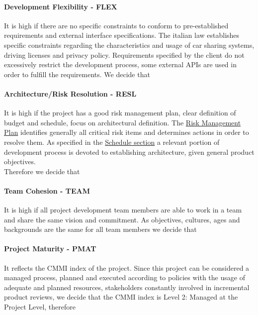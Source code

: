 \paragraph{Development Flexibility - FLEX} It is high if there are no specific constraints to conform to pre-established requirements and external interface specifications. The italian law establishes specific constraints regarding the characteristics and usage of car sharing systems, driving licenses and privacy policy. Requirements specified by the client do not excessively restrict the development process, some external APIs are used in order to fulfill the requirements. We decide that

\paragraph{Architecture/Risk Resolution - RESL} It is high if the project has a good risk management plan, clear definition of budget and schedule, focus on architectural definition. The \hyperref[sec:riskManagement]{Risk Management Plan} identifies generally all critical risk items and determines actions in order to resolve them. As specified in the \hyperref[sec:schedule]{Schedule section} a relevant portion of development process is devoted to establishing architecture, given general product objectives.\\Therefore we decide that

\paragraph{Team Cohesion - TEAM} It is high if all project development team members are able to work in a team and share the same vision and commitment. As objectives, cultures, ages and backgrounds are the same for all team members we decide that

\paragraph{Project Maturity - PMAT} It reflects the CMMI index of the project. Since this project can be considered a managed process, planned and executed according to policies with the usage of adequate and planned resources, stakeholders constantly involved in incremental product reviews, we decide that the CMMI index is Level 2: Managed at the Project Level, therefore

